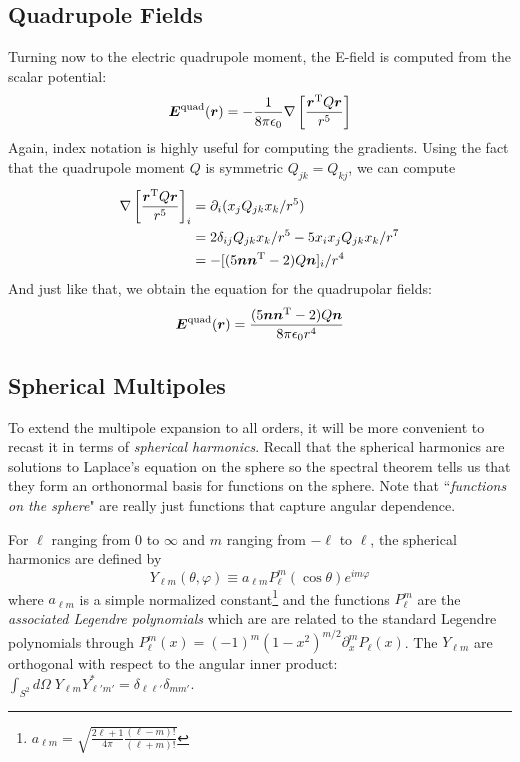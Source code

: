 \documentclass[twocolumn]{gwclass}
\begin{document}
	\subsection{Quadrupole Fields}
	Turning now to the electric quadrupole moment, the E-field is computed from the scalar potential:
	$$ \boldsymbol{E}^{\text{\normalfont{quad}}}(\boldsymbol{r}) = -\frac{1}{8\pi\epsilon_0}\nabla\left[\frac{\boldsymbol{r}^{\text{\normalfont{T}}}Q\boldsymbol{r}}{r^5}\right] $$
	Again, index notation is highly useful for computing the gradients. Using the fact that the quadrupole moment $Q$ is symmetric $Q_{jk}=Q_{kj}$, we can compute 
	\begin{align*}
		\nabla\left[\frac{\boldsymbol{r}^{\text{\normalfont{T}}}Q\boldsymbol{r}}{r^5}\right]_i &= \partial_i (x_jQ_{jk}x_k/r^5) \\
		&= 2\delta_{ij}Q_{jk}x_k/r^5 - 5x_ix_jQ_{jk}x_k/r^7 \\
		&= -[(5\boldsymbol{n}\boldsymbol{n}^{\text{\normalfont{T}}} - 2)Q\boldsymbol{n}]_i/r^4
	\end{align*}
	And just like that, we obtain the equation for the quadrupolar fields:
	$$ \boldsymbol{E}^{\text{\normalfont{quad}}}(\boldsymbol{r}) = \frac{(5\boldsymbol{n}\boldsymbol{n}^{\text{\normalfont{T}}} - 2)Q\boldsymbol{n}}{8\pi\epsilon_0 r^4} $$
	
	\subsection{Spherical Multipoles}
	To extend the multipole expansion to all orders, it will be more convenient to recast it in terms of \emph{spherical harmonics}. Recall that the spherical harmonics are solutions to Laplace's equation on the sphere so the spectral theorem tells us that they form an orthonormal basis for functions on the sphere. Note that ``\emph{functions on the sphere}" are really just functions that capture angular dependence. 
	
	For $\ell$ ranging from $0$ to $\infty$ and $m$ ranging from $-\ell$ to $\ell$, the spherical harmonics are defined by
	$$ Y_{\ell m}(\theta,\varphi) \equiv a_{\ell m}P_\ell^m(\cos\theta) e^{im\varphi} $$
	where $a_{\ell m}$ is a simple normalized constant\footnote{$a_{\ell m}=\sqrt{\frac{2\ell+1}{4\pi}\frac{(\ell-m)!}{(\ell+m)!}}$} and the functions $P_\ell^m$ are the \emph{associated Legendre polynomials} which are are related to the standard Legendre polynomials through $P_\ell^m(x)=(-1)^m(1-x^2)^{m/2}\partial_x^mP_\ell(x)$. The $Y_{\ell m}$ are orthogonal with respect to the angular inner product: $\int_{S^2}d\Omega\;Y_{\ell m} Y_{\ell' m'}^* = \delta_{\ell\ell'}\delta_{mm'}$. 
	
\end{document}
